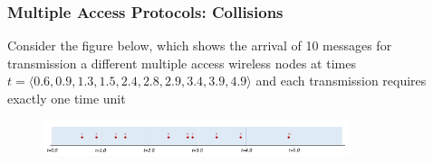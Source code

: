     \subsubsection*{Multiple Access Protocols: Collisions}
    \noindent Consider the figure below, which shows the arrival of 10 messages for transmission a different multiple access wireless nodes at times
    \(t=\langle0.6, 0.9, 1.3, 1.5, 2.4, 2.8, 2.9, 3.4, 3.9, 4.9\rangle\) and each transmission requires exactly one time unit
    \begin{figure}[H]
        \centering
        \includegraphics[width=0.8\textwidth]{img/descarga (2).png}
    \end{figure}
